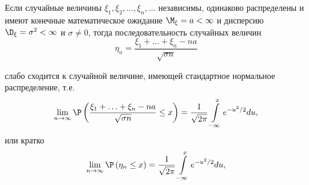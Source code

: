 \begin{theorem}
Если случайные величины $\xi_1 , \xi_2 , \ldots , \xi_n , \ldots$ независимы, одинаково распределены и имеют конечные математическое ожидание $\M_{\xi} = a < \infty$ и дисперсию $\D_{\xi} = \sigma^2 < \infty$ и $\sigma \ne 0$, тогда последовательность случайных величин
$$
\eta_n =
\frac{
	\xi_1 + \ldots + \xi_n - na
}{\sqrt{\sigma n}}
$$

слабо сходится к случайной величине, имеющей стандартное нормальное распределение, т.е.
$$
\lim\limits_{n\to\infty}
\P\left(
	\frac{
		\xi_1 + \ldots + \xi_n - na
	}{\sqrt{\sigma n}}\leq x
\right)
=\frac{1}{\sqrt{2\pi}}\int\limits_{-\infty}^x e^{-u^2/2} du,
$$
или кратко
$$
\lim\limits_{n\to\infty}
\P\left(
	\eta_n \leq x
\right)
=\frac{1}{\sqrt{2\pi}}\int\limits_{-\infty}^x e^{-u^2/2} du,
$$
\end{theorem}
